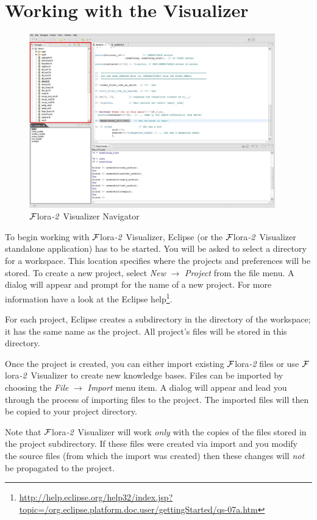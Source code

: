 \documentclass[a4paper,11pt]{article}
\newcommand{\FLORA}{{\mbox{\sc ${\cal F}${lora}\rm\emph{-2}}}\xspace}
\newcommand{\FVIZ}{{\mbox{\sc ${\cal F}${lora}\rm\emph{-2} {Visualizer}}}\xspace}
\begin{document}
\section{Working with the Visualizer}

\begin{figure}[tbh]
	\centering
		\includegraphics[width=0.95\textwidth]{fviz_navigator}
	\caption{\FVIZ Navigator}
	\label{fig:fviz_navigator}
\end{figure}

To begin working with \FVIZ, Eclipse (or the \FVIZ standalone application)
has to be started. You will be asked to select a directory for a
workspace. This location specifies where the projects and preferences will
be stored.  To create a new project, select
\emph{New} $\rightarrow$ \emph{Project} from the file menu.
A dialog will appear and prompt for
the name of a new project.  For more information have a look at the Eclipse
help\footnote{
  \url{http://help.eclipse.org/help32/index.jsp?topic=/org.eclipse.platform.doc.user/gettingStarted/qs-07a.htm}
}.

For each project, Eclipse creates a subdirectory in the directory of
the workspace; it has the same name as the project. All project's files
will be stored in this directory.

Once the project is created, you can either import existing \FLORA files or
use \FVIZ to create new knowledge bases.
Files can be imported by choosing the
\emph{File} $\rightarrow$ \emph{Import} menu item.
A dialog will appear and lead you through the process of
importing files to the project.
The imported files will then be copied to your project directory.

Note that \FVIZ will work \emph{only} with the copies of the files stored
in the project subdirectory. If these files were created via import and you
modify the source files (from which the import was created)
then these changes will \emph{not} be propagated to
the project.
\end{document}
